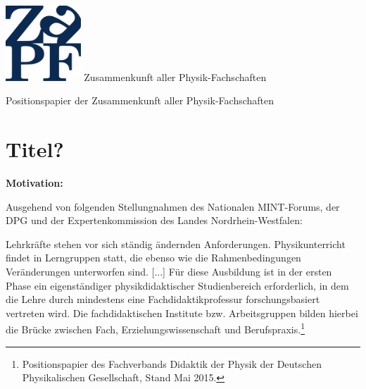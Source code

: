 \documentclass[DIV=calc]{scrartcl}
\begin{document}
\hspace{0.87\textwidth}
\begin{minipage}{120pt}
\vspace{-1.8cm}
\includegraphics[width=80pt]{logo.pdf}
\centering
\small Zusammenkunft aller Physik-Fachschaften
\end{minipage}
\begin{center}
\huge{Positionspapier der Zusammenkunft aller Physik-Fachschaften} \\
\normalsize
\end{center}

\vspace{1cm}
\section*{Titel?}

\textbf{Motivation:}

Ausgehend von folgenden Stellungnahmen des Nationalen MINT-Forums, der DPG und der Expertenkommission des Landes Nordrhein-Westfalen:

\glqq Lehrkräfte stehen vor sich ständig ändernden Anforderungen. Physikunterricht findet in Lerngruppen statt, die ebenso wie die Rahmenbedingungen Veränder\-ungen unterworfen sind. [...] Für diese Ausbildung ist in der ersten Phase ein eigenständiger physikdidaktischer Studienbereich erforderlich, in dem die Lehre durch mindestens eine Fachdidaktikprofessur forschungsbasiert vertreten wird. Die fachdidaktischen Institute bzw. Arbeitsgruppen bilden hierbei die Brücke zwischen Fach, Erziehungswissenschaft und Berufspraxis.\grqq\footnote{Positionspapier des Fachverbands Didaktik der Physik der Deutschen Physikalischen Gesellschaft, Stand Mai 2015.}
\end{document}
